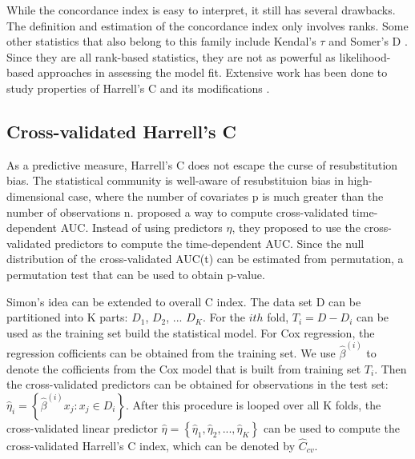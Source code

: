 \documentclass[11pt]{article}
\begin{document}
	\par While the concordance index is easy to interpret, it still has several drawbacks. The definition and estimation of the concordance index only involves ranks. Some other statistics that also belong to this family include Kendal's $\tau$ and Somer's D . Since they are all rank-based statistics, they are not as powerful as likelihood-based approaches in assessing the model fit.  Extensive work has been done to study properties of Harrell's C and its modifications \citep{Pencina2012}\citep{Kang2015}\citep{Uno2011}.

	\subsection{Cross-validated Harrell's C}

	\par As a predictive measure, Harrell's C does not escape the curse of resubstitution bias. The statistical community is well-aware of resubstituion bias in high-dimensional case, where the number of covariates p is much greater than the number of observations n. \cite{Simon2011} proposed a way to compute cross-validated time-dependent AUC. Instead of using predictors $\eta$, they proposed to use the cross-validated predictors to compute the time-dependent AUC. Since the null distribution of the cross-validated AUC(t) can be estimated from permutation, a permutation test that can be used to obtain p-value.

	\par Simon's idea can be extended to overall C index. The data set D can be partitioned into K parts: $D_{1}$, $D_{2}$, ... $D_{K}$. For the $ith$ fold, $T_{i} = D-D_{i}$ can be used as the training set build the statistical model. For Cox regression, the regression cofficients can be obtained from the training set. We use $\hat{\beta}^{(i)}$ to denote the cofficients from the Cox model that is built from training set $T_{i}$. Then the cross-validated predictors can be obtained for observations in the test set: $\hat{\eta}_{i} = \left\{ \hat{\beta}^{(i)}x_{j}: x_{j}\in D_{i}  \right\} $. After this procedure is looped over all K folds, the cross-validated linear predictor $\hat{\eta} = \left\{ \hat{\eta}_{1},  \hat{\eta}_{2}, ...,  \hat{\eta}_{K} \right\}$ can be used to compute the cross-validated Harrell's C index, which can be denoted by $\hat{C}_{cv}$.
\end{document}
